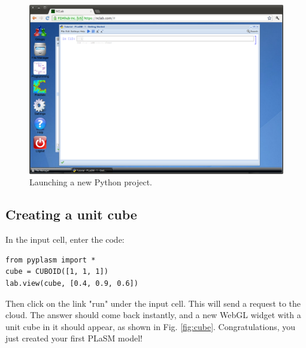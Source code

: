 \documentclass[article,A4,12pt]{llncs}
\begin{document}
\begin{figure}[!ht]
\begin{center}
\includegraphics[width=\textwidth]{img/python.png}
\end{center}
\caption{Launching a new Python project.}
\label{fig:python}
\end{figure}
\noindent



\subsection{Creating a unit cube}

In the input cell, enter the code:

\begin{verbatim}
from pyplasm import *
cube = CUBOID([1, 1, 1])
lab.view(cube, [0.4, 0.9, 0.6])
\end{verbatim}
Then click on the link "run" under the input cell. This will send a request 
to the cloud. The answer should come back instantly, and a new WebGL widget 
with a unit cube in it should appear, as shown in Fig. \ref{fig:cube}. 
Congratulations, you just created your first PLaSM model!
\end{document}
